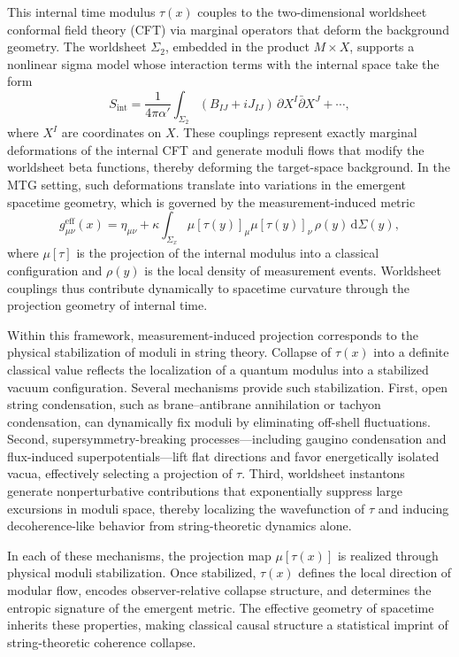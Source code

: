 \documentclass[11pt]{article}
\begin{document}
This internal time modulus \( \tau(x) \) couples to the two-dimensional worldsheet conformal field theory (CFT) via marginal operators that deform the background geometry. The worldsheet \( \Sigma_2 \), embedded in the product \( M \times X \), supports a nonlinear sigma model whose interaction terms with the internal space take the form
\begin{equation}
S_{\mathrm{int}} = \frac{1}{4\pi\alpha'} \int_{\Sigma_2} (B_{IJ} + i J_{IJ}) \, \partial X^I \bar{\partial} X^J + \cdots,
\end{equation}
where \( X^I \) are coordinates on \( X \). These couplings represent exactly marginal deformations of the internal CFT and generate moduli flows that modify the worldsheet beta functions, thereby deforming the target-space background. In the MTG setting, such deformations translate into variations in the emergent spacetime geometry, which is governed by the measurement-induced metric
\begin{equation}
g^{\mathrm{eff}}_{\mu\nu}(x) = \eta_{\mu\nu} + \kappa \int_{\Sigma_x} \mu[\tau(y)]_\mu \mu[\tau(y)]_\nu \, \rho(y) \, \mathrm{d}\Sigma(y),
\end{equation}
where \( \mu[\tau] \) is the projection of the internal modulus into a classical configuration and \( \rho(y) \) is the local density of measurement events. Worldsheet couplings thus contribute dynamically to spacetime curvature through the projection geometry of internal time.

Within this framework, measurement-induced projection corresponds to the physical stabilization of moduli in string theory. Collapse of \( \tau(x) \) into a definite classical value reflects the localization of a quantum modulus into a stabilized vacuum configuration. Several mechanisms provide such stabilization. First, open string condensation, such as brane--antibrane annihilation or tachyon condensation, can dynamically fix moduli by eliminating off-shell fluctuations. Second, supersymmetry-breaking processes—including gaugino condensation and flux-induced superpotentials—lift flat directions and favor energetically isolated vacua, effectively selecting a projection of \( \tau \). Third, worldsheet instantons generate nonperturbative contributions that exponentially suppress large excursions in moduli space, thereby localizing the wavefunction of \( \tau \) and inducing decoherence-like behavior from string-theoretic dynamics alone.

In each of these mechanisms, the projection map \( \mu[\tau(x)] \) is realized through physical moduli stabilization. Once stabilized, \( \tau(x) \) defines the local direction of modular flow, encodes observer-relative collapse structure, and determines the entropic signature of the emergent metric. The effective geometry of spacetime inherits these properties, making classical causal structure a statistical imprint of string-theoretic coherence collapse.
\end{document}
